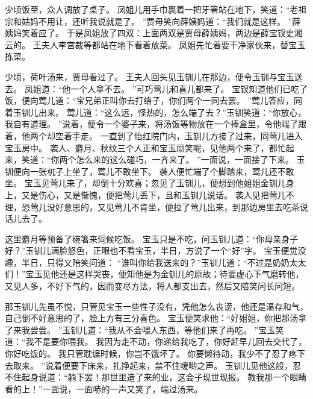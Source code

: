 少顷饭至，众人调放了桌子。
凤姐儿用手巾裹着一把牙箸站在地下，笑道：“老祖宗和姑妈不用让，还听我说就是了。
”贾母笑向薛姨妈道：“我们就是这样。
”薛姨妈笑着应了。
于是凤姐放了四双：上面两双是贾母薛姨妈，两边是薛宝钗史湘云的。
王夫人李宫裁等都站在地下看着放菜。
凤姐先忙着要干净家伙来，替宝玉拣菜。
\par
少顷，荷叶汤来，贾母看过了。
王夫人回头见玉钏儿在那边，便令玉钏与宝玉送去。
凤姐道：“他一个人拿不去。
”可巧莺儿和喜儿都来了。
宝钗知道他们已吃了饭，便向莺儿道：“宝兄弟正叫你去打络子，你们两个一同去罢。
”莺儿答应，同着玉钏儿出来。
莺儿道：“这么远，怪热的，怎么端了去？”玉钏笑道：“你放心，我自有道理。
”说着，便令一个婆子来，将汤饭等物放在一个捧盒里，令他端了跟着，他两个却空着手走。
一直到了怡红院门内，玉钏儿方接了过来，同莺儿进入宝玉房中。
袭人、麝月、秋纹三个人正和宝玉顽笑呢，见他两个来了，都忙起来，笑道：“你两个怎么来的这么碰巧，一齐来了。
”一面说，一面接了下来。
玉钏便向一张杌子上坐了，莺儿不敢坐下。
袭人便忙端了个脚踏来，莺儿还不敢坐。
宝玉见莺儿来了，却倒十分欢喜；忽见了玉钏儿，便想到他姐姐金钏儿身上，又是伤心，又是惭愧，便把莺儿丢下，且和玉钏儿说话。
袭人见把莺儿不理，恐莺儿没好意思的，又见莺儿不肯坐，便拉了莺儿出来，到那边房里去吃茶说话儿去了。
\par
这里麝月等预备了碗箸来伺候吃饭。
宝玉只是不吃，问玉钏儿道：“你母亲身子好？”玉钏儿满脸怒色，正眼也不看宝玉，半日，方说了一个“好”字。
宝玉便觉没趣，半日，只得又陪笑问道：
“谁叫你给我送来的？”玉钏儿道：“不过是奶奶太太们！”宝玉见他还是这样哭丧，便知他是为金钏儿的原故；待要虚心下气磨转他，又见人多，不好下气的，因而变尽方法，将人都支出去，然后又陪笑问长问短。
\par
那玉钏儿先虽不悦，只管见宝玉一些性子没有，凭他怎么丧谤，他还是温存和气，自己倒不好意思的了，脸上方有三分喜色。
宝玉便笑求他：“好姐姐，你把那汤拿了来我尝尝。
”玉钏儿道：“我从不会喂人东西，等他们来了再吃。
”宝玉笑道：“我不是要你喂我。
我因为走不动，你递给我吃了，你好赶早儿回去交代了，你好吃饭的。
我只管耽误时候，你岂不饿坏了。
你要懒待动，我少不了忍了疼下去取来。
”说着便要下床来，扎挣起来，禁不住嗳哟之声。
玉钏儿见他这般，忍不住起身说道：“躺下罢！那世里造了来的业，这会子现世现报。
教我那一个眼睛看的上！”一面说，一面哧的一声又笑了，端过汤来。
